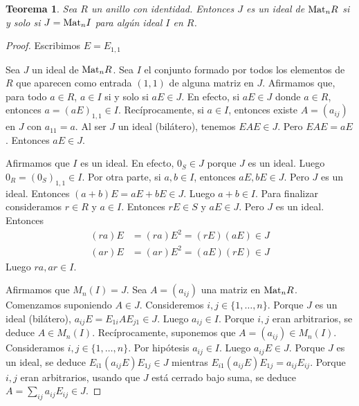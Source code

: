 \documentclass{report}
\newcommand{\Mat}{\textnormal{Mat}}
\newtheorem{theorem}{Teorema}
\begin{document}
  \begin{theorem}
    \label{theorem:matrixRingIdeals}
    Sea \(R\) un anillo con identidad.
    Entonces \(J\) es un ideal de \(\Mat_n R\) si y solo si \(J = \Mat_n I\) para algún ideal \(I\) en \(R\).
  \end{theorem}
  \begin{proof}
    Escribimos \(E = E_{1, 1}\)

    Sea \(J\) un ideal de \(\Mat_n R\).
    Sea \(I\) el conjunto formado por todos los elementos de \(R\) que aparecen como entrada \((1, 1)\) de alguna matriz en \(J\).
    Afirmamos que, para todo \(a \in R\), \(a \in I\) si y solo si \(a E \in J\).
    En efecto, si \(a E \in J\) donde \(a \in R\), entonces \(a = (a E)_{1, 1} \in I\).
    Recíprocamente, si \(a \in I\), entonces existe \(A = (a_{i j})\) en \(J\) con \(a_{1 1} = a\).
    Al ser \(J\) un ideal (bilátero), tenemos \(E A E \in J\).
    Pero \(E A E = a E\).
    Entonces \(a E \in J\).

    Afirmamos que \(I\) es un ideal.
    En efecto, \(0_S \in J\) porque \(J\) es un ideal.
    Luego \(0_R = (0_S)_{1, 1} \in I\).
    Por otra parte, si \(a, b \in I\), entonces \(a E, b E \in J\).
    Pero \(J\) es un ideal.
    Entonces \((a + b) E = a E + b E \in J\).
    Luego \(a + b \in I\).
    Para finalizar consideramos \(r \in R\) y \(a \in I\).
    Entonces \(r E \in S\) y \(a E \in J\).
    Pero \(J\) es un ideal.
    Entonces
    \begin{align}
      (r a) E
      &=
      (r a) E^2
      =
      (r E) (a E)
      \in J
      \\
      (a r) E
      &=
      (a r) E^2
      =
      (a E) (r E)
      \in J
    \end{align}
    Luego \(ra, ar \in I\).

    Afirmamos que \(M_n(I) = J\).
    Sea \(A = (a_{i j})\) una matriz en \(\Mat_n R\).
    Comenzamos suponiendo \(A \in J\).
    Consideremos \(i, j \in \{1, \dots, n\}\).
    Porque \(J\) es un ideal (bilátero), \(a_{i j} E = E_{1 i} A E_{j 1} \in J\).
    Luego \(a_{i j} \in I\).
    Porque \(i, j\) eran arbitrarios, se deduce \(A \in M_n(I)\).
    Recíprocamente, suponemos que \(A = (a_{i j}) \in M_n(I)\).
    Consideramos \(i, j \in \{1, \dots, n\}\).
    Por hipótesis \(a_{i j} \in I\).
    Luego \(a_{i j} E \in J\).
    Porque \(J\) es un ideal, se deduce \(E_{i 1} (a_{i j} E) E_{1 j} \in J\) mientras \(E_{i 1} (a_{i j} E) E_{1 j} = a_{i j} E_{i j}\).
    Porque \(i, j\) eran arbitrarios, usando que \(J\) está cerrado bajo suma, se deduce \(A = \sum_{i j} a_{i j} E_{i j} \in J\).
  \end{proof}
\end{document}
